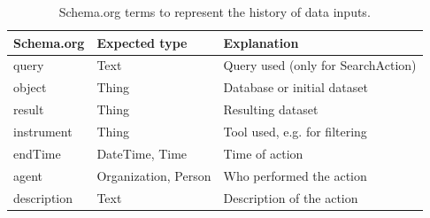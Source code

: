 \begin{table}[bt!]
\caption{Schema.org terms to represent the history of data inputs.}\label{tab:renske:action_schemaorg}
\begin{tabularx}{\linewidth}{l l L}
\toprule
Schema.org & Expected type & Explanation \\
\midrule
query & Text & Query used (only for SearchAction) \\ %
object & Thing & Database or initial dataset \\ %
result & Thing & Resulting dataset \\ %
instrument & Thing & Tool used, e.g. for filtering \\ %
endTime & DateTime, Time & Time of action \\ %
agent & Organization, Person & Who performed the action \\ %
description & Text & Description of the action \\ %
\bottomrule
\end{tabularx}
\end{table}
